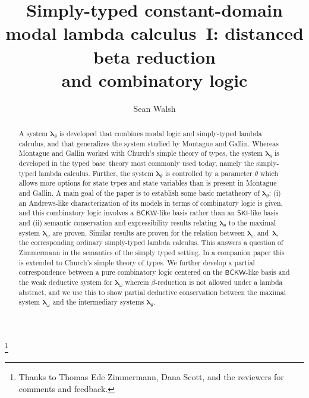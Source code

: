 \documentclass{lmcs} %
\newcommand{\param}{\theta}
\newcommand{\mlt}[1]{\boldsymbol\lambda_{#1}}
\newcommand{\mltup}{\boldsymbol\lambda_{\param}}
\newcommand{\mltpure}{\mlt{\omega}}
\newcommand{\lt}{\boldsymbol\lambda}
\begin{document}
\title[Simply-typed constant-domain modal lambda calculus~I]{Simply-typed constant-domain modal lambda calculus~I: distanced beta reduction\texorpdfstring{\\}{} and combinatory logic}


\thanks{Thanks to Thomas Ede Zimmermann, Dana Scott, and the reviewers for comments and feedback.}

\author[S.~Walsh]{Sean Walsh}


\address{}



\address{UCLA Department of Philosophy \\ 390 Portola Plaza \\ 300 Dodd Hall \\ Box 951451 \\ Los Angeles, CA 90095-1451}






\begin{abstract}
A system $\mltup$ is developed that combines modal logic and simply-typed lambda calculus, and that generalizes the system studied by Montague and Gallin. Whereas Montague and Gallin worked with Church's simple theory of types, the system $\mltup$ is developed in the typed base~theory most commonly used today, namely the simply-typed lambda calculus. Further, the system $\mltup$ is controlled by a parameter $\param$ which allows more options for state types and state variables than is present in Montague and Gallin. A main goal of the paper is to establish some basic metatheory of $\mltup$: (i) an Andrews-like characterization of its models in terms of combinatory logic is given, and this combinatory logic involves a $\mathsf{BCKW}$-like basis rather than an $\mathsf{SKI}$-like basis and (ii) semantic conservation and expressibility results relating $\mltup$ to the maximal system $\mltpure$ are proven. Similar results are proven for the relation between $\mltpure$ and~$\lt$, the corresponding ordinary simply-typed lambda calculus. This answers a question of Zimmermann in the semantics of the simply typed setting. In a companion paper this is extended to Church's simple theory of types. We further develop a partial correspondence between a pure combinatory logic centered on the $\mathsf{BCKW}$-like basis and the weak deductive system for $\mltpure$ wherein $\beta$-reduction is not allowed under a lambda abstract, and we use this to show partial deductive conservation between the maximal system $\mltpure$ and the intermediary systems $\mltup$.
\end{abstract}
\end{document}

